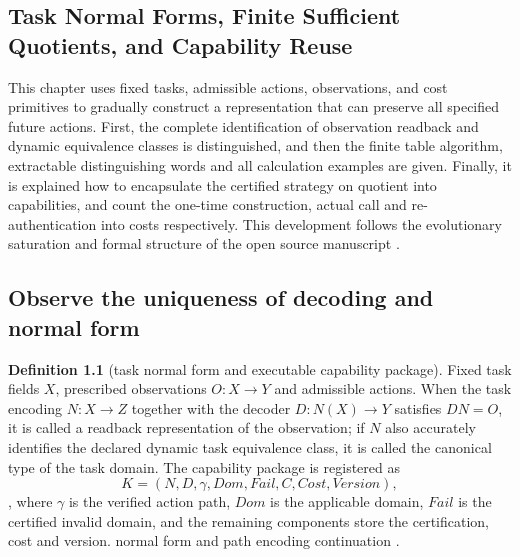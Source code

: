 \documentclass[12pt,a4paper,openany,notitlepage]{report}
\theoremstyle{plain}
\theoremstyle{definition}
\newtheorem{definition}[theorem]{Definition}
\theoremstyle{remark}
\def\mathcal#1{#1}\def\mathsf#1{#1}\def\mathbb#1{#1}%
\begin{document}
\begin{CJK*}
\chapter{Task Normal Forms, Finite Sufficient Quotients, and Capability Reuse}
\label{exp:ch:normalform}


\label{hgov:sec:normalform}

This chapter uses fixed tasks, admissible actions, observations, and cost primitives to gradually construct a representation that can preserve all specified future actions. First, the complete identification of observation readback and dynamic equivalence classes is distinguished, and then the finite table algorithm, extractable distinguishing words and all calculation examples are given. Finally, it is explained how to encapsulate the certified strategy on quotient into capabilities, and count the one-time construction, actual call and re-authentication into costs respectively. This development follows the evolutionary saturation and formal structure of the open source manuscript \cite{S19,S38,GFrameworkSynthesis}.

\section { Observe the uniqueness of decoding and normal form }\label{exp:gov:normalform-section}


\begin{definition}
[task normal form and executable capability package]\label{hgov:def:normalform}
Fixed task fields $X$, prescribed observations $O:X\to Y$ and admissible actions. When the task encoding $N:X\to Z$ together with the decoder $D:N(X)\to Y$ satisfies $DN=O$, it is called a readback representation of the observation; if $N$ also accurately identifies the declared dynamic task equivalence class, it is called the canonical type of the task domain. The capability package is registered as \[
\mathcal K=(N,D,\gamma,\mathsf{Dom},\mathsf{Fail},\mathcal C,
\mathsf{Cost},\mathsf{Version}),
\], where $\gamma$ is the verified action path, $\mathsf{Dom}$ is the applicable domain, $\mathsf{Fail}$ is the certified invalid domain, and the remaining components store the certification, cost and version. normal form and path encoding continuation \cite{S19,S38,GFrameworkSynthesis}.\end{definition}



\end{CJK*}
\end{document}
